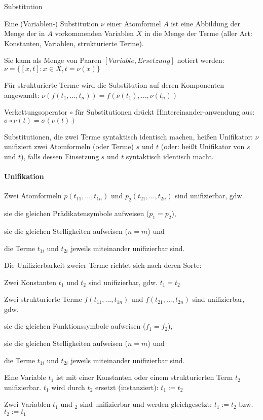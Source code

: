 \documentclass[a4paper]{article}
\begin{document}
\begin{multicols}{3}
  Substitution
  \begin{itemize*}
    \item Eine (Variablen-) Substitution $\nu$ einer Atomformel $A$ ist eine Abbildung der Menge der in $A$ vorkommenden Variablen $X$ in die Menge der Terme (aller Art: Konstanten, Variablen, strukturierte Terme).
    \item Sie kann als Menge von Paaren $[Variable,Ersetzung]$ notiert werden: $\nu=\{[x,t]: x\in X, t=\nu(x)\}$
    \item Für strukturierte Terme wird die Substitution auf deren Komponenten angewandt: $\nu(f(t_1,...,t_n)) = f(\nu(t_1),...,\nu(t_n))$
    \item Verkettungsoperator $\circ$ für Substitutionen drückt Hintereinander-anwendung aus: $\sigma\circ\nu(t)=\sigma(\nu(t))$
    \item Substitutionen, die zwei Terme syntaktisch identisch machen, heißen Unifikator: $\nu$unifiziert zwei Atomformeln (oder Terme) $s$ und $t$ (oder: heißt Unifikator von $s$ und $t$), falls dessen Einsetzung $s$ und $t$ syntaktisch identisch macht.
  \end{itemize*}

  \paragraph{Unifikation}
  Zwei Atomformeln $p(t_{11},...,t_{1n})$ und $p_2(t_{21},...,t_{2n})$ sind unifizierbar, gdw.
  \begin{itemize*}
    \item sie die gleichen Prädikatensymbole aufweisen ($p_1= p_2$),
    \item sie die gleichen Stelligkeiten aufweisen ($n = m$) und
    \item die Terme $t_{1i}$ und $t_{2i}$ jeweils miteinander unifizierbar sind.
  \end{itemize*}

  Die Unifizierbarkeit zweier Terme richtet sich nach deren Sorte:
  \begin{enumerate*}
    \item Zwei Konstanten $t_1$ und $t_2$ sind unifizierbar, gdw. $t_1= t_2$
    \item Zwei strukturierte Terme $f(t_{11},...,t_{1n})$ und $f(t_{21},...,t_{2n})$ sind unifizierbar, gdw.
    \begin{itemize*}
      \item sie die gleichen Funktionssymbole aufweisen ($f_1= f_2$),
      \item sie die gleichen Stelligkeiten aufweisen ($n=m$) und
      \item die Terme $t_{1i}$ und $t_{2i}$ jeweils miteinander unifizierbar sind.
    \end{itemize*}
    \item Eine Variable $t_1$ ist mit einer Konstanten oder einem strukturierten Term $t_2$ unifizierbar. $t_1$ wird durch $t_2$ ersetzt (instanziert): $t_1:= t_2$
    \item Zwei Variablen $t_1$ und $_2$ sind unifizierbar und werden gleichgesetzt: $t_1:=t_2$ bzw. $t_2:= t_1$
  \end{enumerate*}


\end{multicols}
\end{document}
